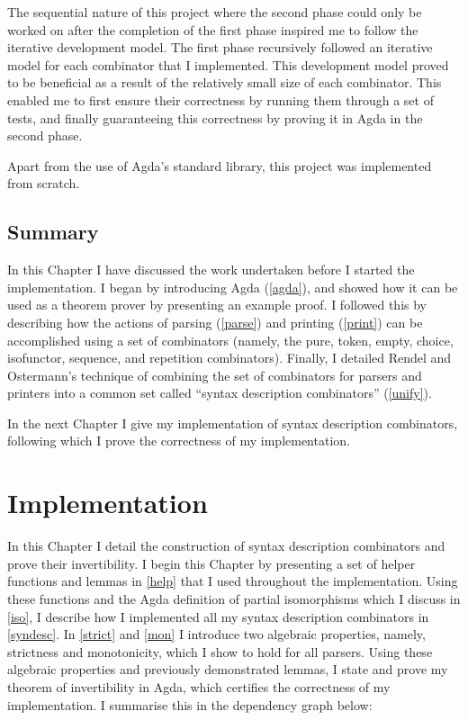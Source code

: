 \documentclass[12pt,a4paper,twoside,openright]{report}
\begin{document}
The sequential nature of this project where the second phase could only be worked on after the completion of the first phase inspired me to follow the iterative development model. The first phase recursively followed an iterative model for each combinator that I implemented. This development model proved to be beneficial as a result of the relatively small size of each combinator. This enabled me to first ensure their correctness by running them through a set of tests, and finally guaranteeing this correctness by proving it in Agda in the second phase.

Apart from the use of Agda's standard library, this project was implemented from scratch.

\section{Summary}

In this Chapter I have discussed the work undertaken before I started the implementation. I began by introducing Agda (\autoref{agda}), and showed how it can be used as a theorem prover by presenting an example proof. I followed this by describing how the actions of parsing (\autoref{parse}) and printing (\autoref{print}) can be accomplished using a set of combinators (namely, the pure, token, empty, choice, isofunctor, sequence, and repetition combinators).
Finally, I detailed Rendel and Ostermann's technique of combining the set of combinators for parsers and printers into a common set called ``syntax description combinators'' (\autoref{unify}).

In the next Chapter I give my implementation of syntax description combinators, following which I prove the correctness of my implementation.

\chapter{Implementation} \label{chap3}

In this Chapter I detail the construction of syntax description combinators and prove their invertibility. I begin this Chapter by presenting a set of helper functions and lemmas in \autoref{help} that I used throughout the implementation. Using these functions and the Agda definition of partial isomorphisms which I discuss in \autoref{iso}, I describe how I implemented all my syntax description combinators in \autoref{syndesc}. In \autoref{strict} and \autoref{mon} I introduce two algebraic properties, namely, strictness and monotonicity, which I show to hold for all parsers. Using these algebraic properties and previously demonstrated lemmas, I state and prove my theorem of invertibility in Agda, which certifies the correctness of my implementation. I summarise this in the dependency graph below:\\
\end{document}
